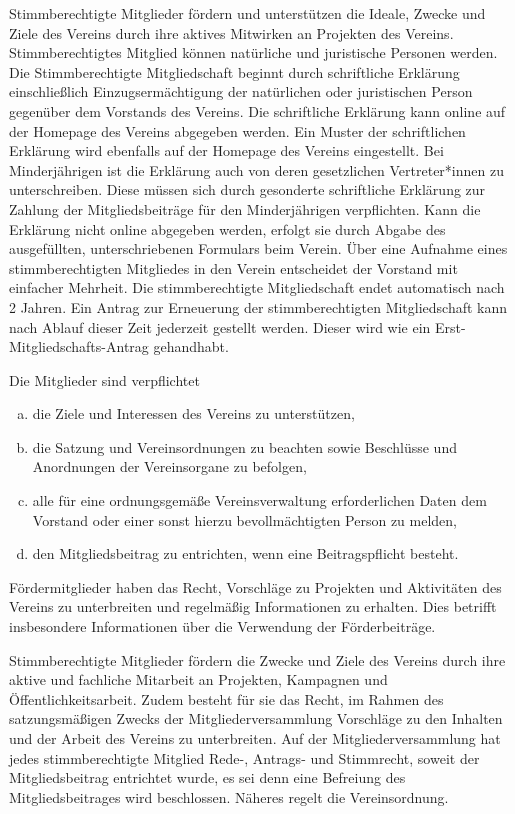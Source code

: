 \begin{contract}
    Stimmberechtigte Mitglieder fördern und unterstützen die Ideale, Zwecke und Ziele des Vereins durch ihre aktives Mitwirken an Projekten des Vereins. Stimmberechtigtes Mitglied können natürliche und juristische Personen werden. Die Stimmberechtigte Mitgliedschaft beginnt durch schriftliche Erklärung einschließlich Einzugsermächtigung der natürlichen oder juristischen Person gegenüber dem Vorstands des Vereins. Die schriftliche Erklärung kann online auf der Homepage des Vereins abgegeben werden. Ein Muster der schriftlichen Erklärung wird ebenfalls auf der Homepage des Vereins eingestellt. Bei Minderjährigen ist die Erklärung auch von deren gesetzlichen Vertreter*innen zu unterschreiben. Diese müssen sich durch gesonderte schriftliche Erklärung zur Zahlung der Mitgliedsbeiträge für den Minderjährigen verpflichten. Kann die Erklärung nicht online abgegeben werden, erfolgt sie durch Abgabe des ausgefüllten, unterschriebenen Formulars beim Verein. Über eine Aufnahme eines stimmberechtigten Mitgliedes in den Verein entscheidet der Vorstand mit einfacher Mehrheit. Die stimmberechtigte Mitgliedschaft endet automatisch nach 2 Jahren. Ein Antrag zur Erneuerung der stimmberechtigten Mitgliedschaft kann nach Ablauf dieser Zeit jederzeit gestellt werden. Dieser wird wie ein Erst-Mitgliedschafts-Antrag gehandhabt.


    Die Mitglieder sind verpflichtet
    \begin{enumerate}[(a)]
        \item die Ziele und Interessen des Vereins zu unterstützen,
        \item die Satzung und Vereinsordnungen zu beachten sowie Beschlüsse und Anordnungen der Vereinsorgane zu befolgen,
        \item alle für eine ordnungsgemäße Vereinsverwaltung erforderlichen Daten dem Vorstand oder einer sonst hierzu bevollmächtigten Person zu melden,
        \item den Mitgliedsbeitrag zu entrichten, wenn eine Beitragspflicht besteht.
    \end{enumerate}

    Fördermitglieder haben das Recht, Vorschläge zu Projekten und Aktivitäten des Vereins zu unterbreiten und regelmäßig Informationen zu erhalten. Dies betrifft insbesondere Informationen über die Verwendung der Förderbeiträge.

    Stimmberechtigte Mitglieder fördern die Zwecke und Ziele des Vereins durch ihre aktive und fachliche Mitarbeit an Projekten, Kampagnen und Öffentlichkeitsarbeit. Zudem besteht für sie das Recht, im Rahmen des satzungsmäßigen Zwecks der Mitgliederversammlung Vorschläge zu den Inhalten und der Arbeit des Vereins zu unterbreiten. Auf der Mitgliederversammlung hat jedes stimmberechtigte Mitglied Rede-, Antrags- und Stimmrecht, soweit der Mitgliedsbeitrag entrichtet wurde, es sei denn eine Befreiung des Mitgliedsbeitrages wird beschlossen. Näheres regelt die Vereinsordnung.


\end{contract}

